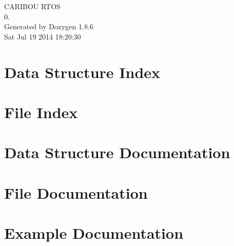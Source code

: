 \documentclass[twoside]{book}
\newcommand{\clearemptydoublepage}{%
  \newpage{\pagestyle{empty}\cleardoublepage}%
}
\begin{document}
\hypersetup{pageanchor=false}
\begin{titlepage}
\vspace*{7cm}
\begin{center}%
{\Large C\-A\-R\-I\-B\-O\-U R\-T\-O\-S \\[1ex]\large 0. }\\
\vspace*{1cm}
{\large Generated by Doxygen 1.8.6}\\
\vspace*{0.5cm}
{\small Sat Jul 19 2014 18:20:30}\\
\end{center}
\end{titlepage}
\clearemptydoublepage
\tableofcontents
\clearemptydoublepage
{}
\hypersetup{pageanchor=true}

\chapter{Data Structure Index}

\chapter{File Index}

\chapter{Data Structure Documentation}

















\chapter{File Documentation}






















































\chapter{Example Documentation}


\newpage
{}
{}
\printindex
\end{document}
